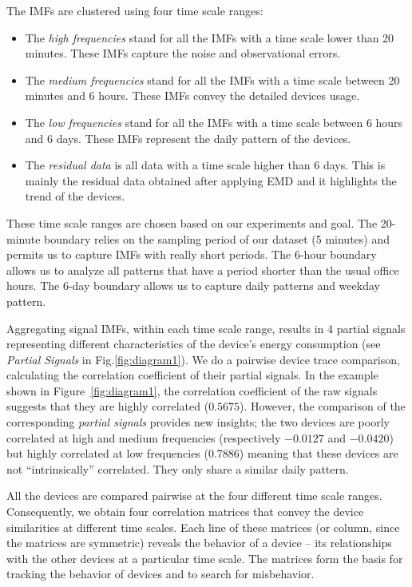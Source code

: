 The IMFs are clustered using four time scale ranges: 
\begin{itemize}
 \item The \emph{high frequencies} stand for all the IMFs with a time scale lower than 20 minutes. These IMFs capture the noise and observational errors.
 \item The \emph{medium frequencies} stand for all the IMFs with a time scale between 20 minutes and 6 hours. These IMFs convey the detailed devices usage.
 \item The \emph{low frequencies} stand for all the IMFs with a time scale between 6 hours and 6 days. These IMFs represent the daily pattern of the devices.
 \item The \emph{residual data} is all data with a time scale higher than 6 days. This is mainly the residual data obtained after applying EMD and it highlights the trend of the devices.
\end{itemize}

These time scale ranges are chosen based on our experiments and goal.
The 20-minute boundary relies on the sampling period of our dataset (5 minutes) and permits us to capture IMFs with really short periods.
The 6-hour boundary allows us to analyze all patterns that have a period shorter than the usual office hours.
The 6-day boundary allows us to capture daily patterns and weekday pattern.

Aggregating signal IMFs, within each time scale range, results in 4 partial signals representing different characteristics of the device's
 energy consumption (see \emph{Partial Signals} in Fig.\ref{fig:diagram1}).
We do a pairwise device trace comparison, calculating the correlation coefficient of their partial signals.
In the example shown in Figure~\ref{fig:diagram1}, the correlation coefficient of the raw signals suggests that they are highly correlated ($0.5675$). 
However, the comparison of the corresponding \emph{partial signals} provides new insights;
the two devices are poorly correlated at high and medium frequencies (respectively $-0.0127$ and $-0.0420$) but highly correlated at low frequencies (0.7886) meaning that these devices are not ``intrinsically'' correlated.  They only share a similar daily pattern.

All the devices are compared pairwise at the four different time scale ranges.
Consequently, we obtain four correlation matrices that convey the device similarities at different time scales.
Each line of these matrices (or column, since the matrices are symmetric) reveals the behavior of a device -- its relationships with the 
other devices at a particular time scale.
The matrices form the basis for tracking the behavior of devices and to search for misbehavior.


